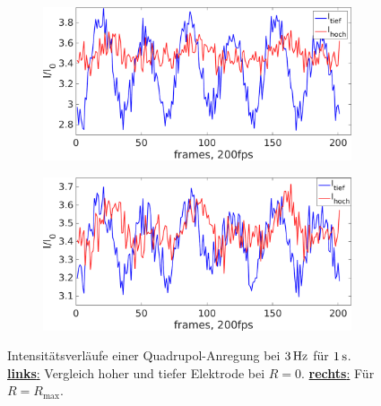 \documentclass[numbers=noenddot,a4paper,notitlepage,twoside,BCOR15mm]{scrbook}
\newcommand{\ix}[1]{_\text{#1}}
\newcommand{\fett}[1]{\textbf{#1}}
\begin{document}
						\begin{figure}[!b]
							\centering
							\begin{subfigure}{0.49\textwidth}
								\centering
								\includegraphics[width=\textwidth,height=0.65\textwidth]{figs/auswertung/plasmaglw/intenshochutiefquadin3Hz1sek.png}
							\end{subfigure}
							\begin{subfigure}{0.49\textwidth}
								\centering
								\includegraphics[width=\textwidth,height=0.65\textwidth]{figs/auswertung/plasmaglw/intenshochutiefquadout3Hz1sek.png}
							\end{subfigure}
							\caption{Intensitätsverläufe einer Quadrupol-Anregung bei $\unit[3]{Hz}$ für $\unit[1]{s}$. \underline{\fett{links}:} Vergleich hoher und tiefer Elektrode bei $R=0$. \underline{\fett{rechts}:} Für $R=R\ix{max}$.}\label{img:intensquadhochutiefrad}
						\end{figure}
\end{document}
